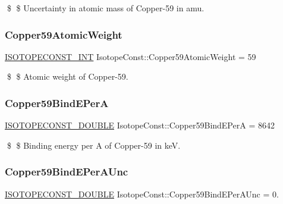 \$ \$ Uncertainty in atomic mass of Copper-\/59 in amu. \mbox{\label{group___isotope_const-_copper-_cu59_gaf450d48f28092338982008b53a42fd44}} 
\subsubsection{\texorpdfstring{Copper59\+Atomic\+Weight}{Copper59AtomicWeight}}
{\footnotesize\ttfamily \mbox{\hyperlink{group___isotope_const-_macros_ga5f18360b3e99483a35c32d789e62621c}{I\+S\+O\+T\+O\+P\+E\+C\+O\+N\+S\+T\+\_\+\+I\+NT}} Isotope\+Const\+::\+Copper59\+Atomic\+Weight = 59}

\$ \$ Atomic weight of Copper-\/59. \mbox{\label{group___isotope_const-_copper-_cu59_ga22a7085d23cf2daf5d10f48e28c93cb4}} 
\subsubsection{\texorpdfstring{Copper59\+Bind\+E\+PerA}{Copper59BindEPerA}}
{\footnotesize\ttfamily \mbox{\hyperlink{group___isotope_const-_macros_ga8f45a7272ce02c0b4c65c44636ed719a}{I\+S\+O\+T\+O\+P\+E\+C\+O\+N\+S\+T\+\_\+\+D\+O\+U\+B\+LE}} Isotope\+Const\+::\+Copper59\+Bind\+E\+PerA = 8642}

\$ \$ Binding energy per A of Copper-\/59 in keV. \mbox{\label{group___isotope_const-_copper-_cu59_gab8ed529d68d98611337b30db2deb0bfe}} 
\subsubsection{\texorpdfstring{Copper59\+Bind\+E\+Per\+A\+Unc}{Copper59BindEPerAUnc}}
{\footnotesize\ttfamily \mbox{\hyperlink{group___isotope_const-_macros_ga8f45a7272ce02c0b4c65c44636ed719a}{I\+S\+O\+T\+O\+P\+E\+C\+O\+N\+S\+T\+\_\+\+D\+O\+U\+B\+LE}} Isotope\+Const\+::\+Copper59\+Bind\+E\+Per\+A\+Unc = 0.}

